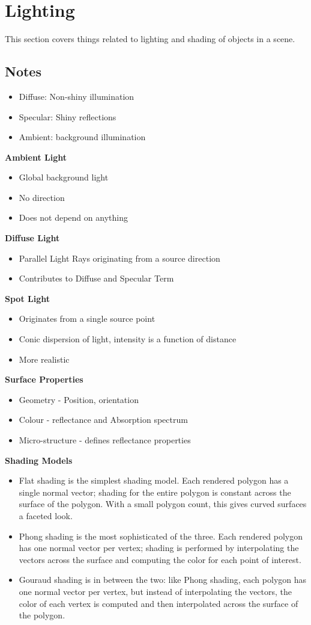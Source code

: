 \newpage
\section{Lighting}
This section covers things related to lighting and shading of objects in a scene.
\subsection{Notes}
\begin{itemize}
	\item Diffuse: Non-shiny illumination
	\item Specular: Shiny reflections
	\item Ambient: background illumination
\end{itemize}
\textbf{Ambient Light}
\begin{itemize}
	\item Global background light
	\item No direction
	\item Does not depend on anything
\end{itemize}
\textbf{Diffuse Light}
\begin{itemize}
	\item Parallel Light Rays originating from a source direction
	\item Contributes to Diffuse and Specular Term
\end{itemize}
\textbf{Spot Light}
\begin{itemize}
	\item Originates from a single source point
	\item Conic dispersion of light, intensity is a function of distance
	\item More realistic
\end{itemize}
\textbf{Surface Properties}
\begin{itemize}
	\item Geometry - Position, orientation
	\item Colour - reflectance and Absorption spectrum
	\item Micro-structure - defines reflectance properties
\end{itemize}
\textbf{Shading Models}
\begin{itemize}
	\item	Flat shading is the simplest shading model. Each rendered polygon has a single normal vector; shading for the entire polygon is constant across the surface of the polygon. With a small polygon count, this gives curved surfaces a faceted look.
	
	\item	Phong shading is the most sophisticated of the three. Each rendered polygon has one normal vector per vertex; shading is performed by interpolating the vectors across the surface and computing the color for each point of interest.
	
	\item	Gouraud shading is in between the two: like Phong shading, each polygon has one normal vector per vertex, but instead of interpolating the vectors, the color of each vertex is computed and then interpolated across the surface of the polygon.
\end{itemize}
